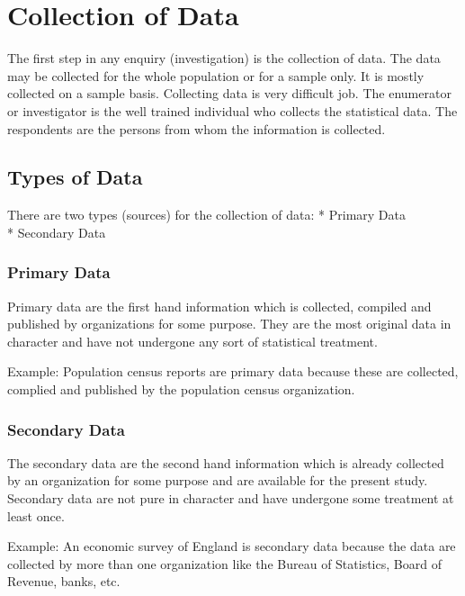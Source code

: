 \documentclass[
]{book}
\begin{document}
\hypertarget{collection-of-data}{%
\section{Collection of Data}\label{collection-of-data}}

The first step in any enquiry (investigation) is the collection of data. The data may be collected for the whole population or for a sample only. It is mostly collected on a sample basis. Collecting data is very difficult job. The enumerator or investigator is the well trained individual who collects the statistical data. The respondents are the persons from whom the information is collected.

\hypertarget{types-of-data}{%
\subsection{Types of Data}\label{types-of-data}}

There are two types (sources) for the collection of data:
* Primary Data\\
* Secondary Data

\hypertarget{primary-data}{%
\subsubsection{Primary Data}\label{primary-data}}

Primary data are the first hand information which is collected, compiled and published by organizations for some purpose. They are the most original data in character and have not undergone any sort of statistical treatment.

Example: Population census reports are primary data because these are collected, complied and published by the population census organization.

\hypertarget{secondary-data}{%
\subsubsection{Secondary Data}\label{secondary-data}}

The secondary data are the second hand information which is already collected by an organization for some purpose and are available for the present study. Secondary data are not pure in character and have undergone some treatment at least once.

Example: An economic survey of England is secondary data because the data are collected by more than one organization like the Bureau of Statistics, Board of Revenue, banks, etc.
\end{document}
